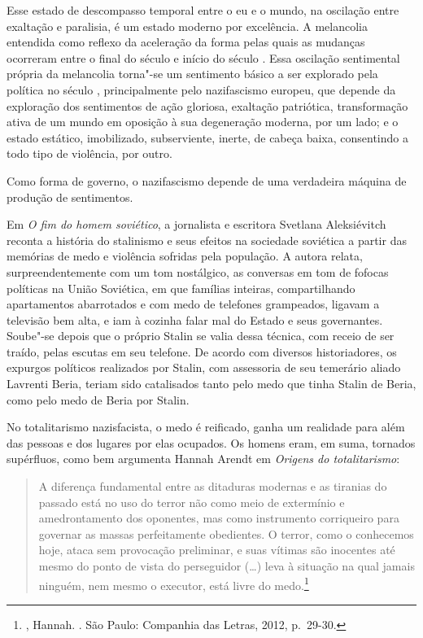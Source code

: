 Esse estado de descompasso temporal entre o eu e o mundo, na oscilação
entre exaltação e paralisia, é um estado moderno por excelência. A
melancolia entendida como reflexo da aceleração da forma pelas quais as
mudanças ocorreram entre o final do século  e início do século .
Essa oscilação sentimental própria da melancolia torna"-se um sentimento
básico a ser explorado pela política no século , principalmente pelo
nazifascismo europeu, que depende da exploração dos sentimentos de ação
gloriosa, exaltação patriótica, transformação ativa de um mundo em
oposição à sua degeneração moderna, por um lado; e o estado estático,
imobilizado, subserviente, inerte, de cabeça baixa, consentindo a todo
tipo de violência, por outro.

Como forma de governo, o nazifascismo depende de uma verdadeira máquina
de produção de sentimentos.

\asterisc

Em \emph{O fim do homem soviético}, a jornalista e escritora Svetlana
Aleksiévitch reconta a história do stalinismo e seus efeitos na sociedade
soviética a partir das memórias de medo e violência sofridas pela
população. A autora relata, surpreendentemente com um tom nostálgico, as
conversas em tom de fofocas políticas na União Soviética, em que
famílias inteiras, compartilhando apartamentos abarrotados e com medo de
telefones grampeados, ligavam a televisão bem alta, e iam à cozinha
falar mal do Estado e seus governantes. Soube"-se depois que o próprio Stalin se valia dessa
técnica, com receio de ser traído, pelas escutas em seu telefone. De
acordo com diversos historiadores, os expurgos políticos realizados por
Stalin, com assessoria de seu temerário aliado Lavrenti Beria, teriam
sido catalisados tanto pelo medo que tinha Stalin de Beria, como pelo
medo de Beria por Stalin.

No totalitarismo nazisfacista, o medo é reificado, ganha um realidade
para além das pessoas e dos lugares por elas ocupados. Os homens eram,
em suma, tornados supérfluos, como bem argumenta Hannah Arendt em
\emph{Origens do totalitarismo}:

\begin{quote}
A diferença fundamental entre as ditaduras modernas e as tiranias do
passado está no uso do terror não como meio de extermínio e
amedrontamento dos oponentes, mas como instrumento corriqueiro para
governar as massas perfeitamente obedientes. O terror, como o conhecemos
hoje, ataca sem provocação preliminar, e suas vítimas são inocentes até
mesmo do ponto de vista do perseguidor (\ldots{}) leva à situação na qual
jamais ninguém, nem mesmo o executor, está livre do medo.\footnote{,
  Hannah. {}. São Paulo: Companhia das Letras, 2012, p.~29-30.}
\end{quote}

